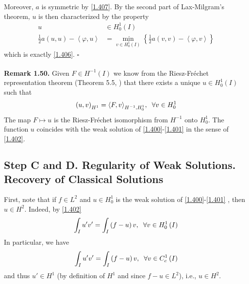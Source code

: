 \documentclass[a4paper,oneside]{book}
\numberwithin{equation}{chapter}
\begin{document}
Moreover, $a$ is symmetric by \eqref{1.407}. By the second part of Lax-Milgram's theorem, $u$ is then characterized by the property
\begin{align}
u &\in H_0^1\left( I \right)\\
\frac{1}{2}a\left( {u,u} \right) - \left\langle {\varphi ,u} \right\rangle & = \mathop {\min }\limits_{v \in H_0^1\left(I\right)} \left\{ {\frac{1}{2}a\left( {v,v} \right) - \left\langle {\varphi ,v} \right\rangle } \right\}
\end{align}
which is exactly \eqref{1.406}. \hfill $\square$\\
\\
\textbf{Remark 1.50.} Given $F\in H^{-1}\left(I\right)$ we know from the Riesz-Fr\'{e}chet representation theorem (Theorem 5.5, \cite{1}) that there exists a unique $u\in H_0^1\left(I\right)$ such that
\begin{align}
{\left( {u,v} \right)_{{H^1}}} = {\left\langle {F,v} \right\rangle _{{H^{ - 1}},H_0^1}},\hspace{0.2cm}\forall v \in H_0^1
\end{align}
The map $F\mapsto u$ is the Riesz-Fr\'{e}chet isomorphism from $H^{-1}$ onto $H_0^1$. The function $u$ coincides with the weak solution of \eqref{1.400}-\eqref{1.401} in the sense of \eqref{1.402}.
\subsection*{Step C and D. Regularity of Weak Solutions. Recovery of Classical Solutions}
First, note that if $f\in L^2$ and $u\in H_0^1$ is the weak solution of \eqref{1.400}-\eqref{1.401} , then $u\in H^2$. Indeed, by \eqref{1.402}
\begin{align}
\int_I {u'v'}  = \int_I {\left( {f - u} \right)v} ,\hspace{0.2cm}\forall v \in H_0^1\left( I \right)
\end{align}
In particular, we have
\begin{align}
\label{1.420}
\int_I {u'v'}  = \int_I {\left( {f - u} \right)v} ,\hspace{0.2cm}\forall v \in C_c^1\left( I \right)
\end{align}
and thus $u'\in H^1$ (by definition of $H^1$ and since $f-u\in L^2$), i.e., $u\in H^2$. 
\end{document}
